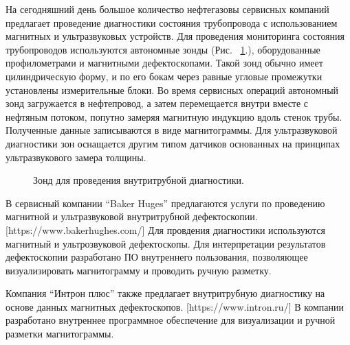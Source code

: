 \documentclass[a4paper,article,14pt]{extarticle}
\begin{document}
На сегодняшний день большое количество нефтегазовы сервисных компаний предлагает проведение диагностики состояния 
трубопровода с использованием магнитных и ультразвуковых устройств. Для проведения мониторинга состояния трубопроводов 
используются автономные зонды (Рис. ~\ref{image1}.), оборудованные профилометрами и магнитными дефектоскопами. Такой зонд обычно имеет 
цилиндрическую форму, и по его бокам через равные угловые промежутки установлены измерительные блоки. Во время сервисных 
операций автономный зонд загружается в нефтепровод, а затем перемещается внутри вместе с нефтяным потоком, попутно замеряя 
магнитную индукцию вдоль стенок трубы. Полученные данные записываются в виде магнитограммы. Для ультразвуковой диагностики зон 
оснащается другим типом датчиков основанных на принципах ультразвукового замера толщины.

\begin{figure}[ht]
    \begin{center}
    
    \caption{
    \label{image1}
    Зонд для проведения внутритрубной диагностики.}
    \end {center}
\end {figure}

В сервисный компании “Baker Huges” предлагаются услуги по проведению магнитной и ультразвуковой внутритрубной дефектоскопии. [https://www.bakerhughes.com/] 
Для провдения диагностики используются магнитный и ультрозвуковой дефектоскопы. Для интерпретации результатов дефектоскопии 
разработано ПО внутреннего пользования, позволяющее визуализировать магнитограмму и проводить ручную разметку.

Компания “Интрон плюс” также предлагает внутритрубную диагностику на основе данных магнитных дефектоскопов. [https://www.intron.ru/] 
В компании разработано внутреннее программное обеспечение для визуализации и ручной разметки магнитограммы. 
\end{document}
